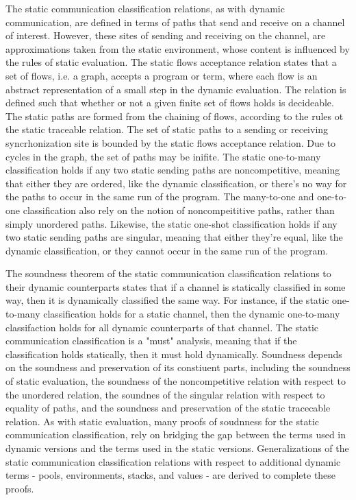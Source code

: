 \documentclass[letterpaper, 11pt]{extarticle}
\begin{document}
The static communication classification relations, as with dynamic communication, are defined in terms of paths
that send and receive on a channel of interest. However, these sites of sending and receiving on the channel, are approximations
taken from the static environment, whose content is influenced by the rules of static evaluation.
The static flows acceptance relation states that a set of flows, i.e. a graph, accepts a program or term, where each flow is
an abstract representation of a small step in the dynamic evaluation. The relation is defined such that
whether or not a given finite set of flows holds is decideable. The static paths are formed from the chaining of flows, according
to the rules ot the static traceable relation.
The set of static paths to a sending or receiving syncrhonization site is bounded by the static flows acceptance
relation. Due to cycles in the graph, the set of paths may be inifite. 
The static one-to-many classification holds if any two static sending paths are noncompetitive, meaning
that either they are ordered, like the dynamic classification, or there's no way for the paths to occur in the same run
of the program. The many-to-one and one-to-one classification also rely on the notion of noncompeititive paths, rather than
simply unordered paths. Likewise, the static one-shot classification holds if any two static sending paths are singular,
meaning that either they're equal, like the dynamic classification, or they cannot occur in the same run of the program.

The soundness theorem of the static communication classification relations to their dynamic counterparts states that if
a channel is statically classified in some way, then it is dynamically classified the same way. For instance, if the
static one-to-many classification holds for a static channel, then the dynamic one-to-many classifaction holds for
all dynamic counterparts of that channel. The static communication classification is a "must" analysis, meaning that
if the classification holds statically, then it must hold dynamically. Soundness depends on the soundness and preservation
of its constiuent parts,
including the soundness of static evaluation, the soundness of the noncompetitive relation with respect to
the unordered relation, the soundnes of the singular relation with respect to equality of paths,
and the soundness and preservation of the static tracecable relation. As with static evaluation, many proofs of
soudnness for the static communication classification, rely on bridging the gap between the terms used in dynamic
versions and the terms used in the static versions. Generalizations of the static communication classification relations
with respect to additional dynamic terms - pools, environments, stacks, and values - are derived to complete these proofs.
\end{document}
